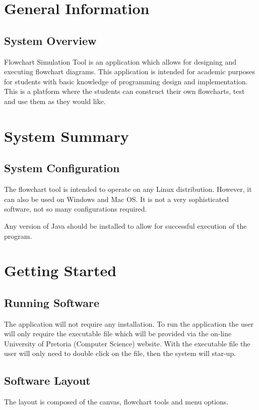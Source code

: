 \documentclass[11pt,a4paper,titlepage]{article}
\begin{document}

\newpage
\tableofcontents
{}
\newpage
{}
\section{General Information}
	\subsection{System Overview}
	
		Flowchart Simulation Tool is an application which allows for 				designing and executing flowchart diagrams. This application is 		intended for academic purposes for students with basic knowledge of 		programming design and implementation. This is a platform where the students can construct their own flowcharts, test and use them as they would like.
	
\section{System Summary}
	\subsection{System Configuration}
		
		The flowchart tool is intended to operate on any Linux 						distribution. However, it can also be used on Windows and 			Mac OS. It is not a very sophisticated software, not so many configurations required.
		
		Any version of Java should be installed to allow for successful execution of the program. 
	
\section{Getting Started}
	\subsection{Running Software}
		The application will not require any installation. To run the 			application the user will only require the executable file which will be provided via the on-line University of Pretoria (Computer Science) website. With the executable file the user will only need to double click on the file, then the system will star-up.
		
		\subsection{Software Layout}
		The layout is composed of the canvas, flowchart tools and menu options. \newline
		
\end{document}
